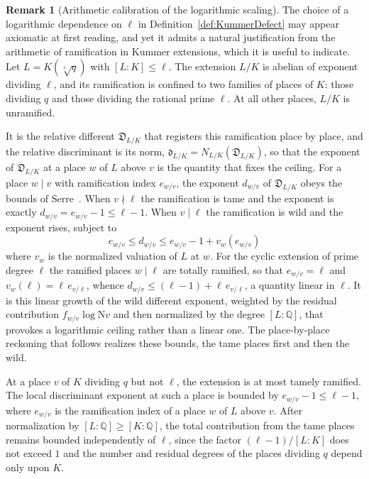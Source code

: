 \documentclass[10pt, reqno]{amsart}
\theoremstyle{plain}
\theoremstyle{definition}
\newtheorem{remark}[theorem]{Remark}
\theoremstyle{plain}
\newcommand{\Q}{\mathbb{Q}}
\begin{document}
\begin{remark}[Arithmetic calibration of the logarithmic scaling]\label{rem:KummerDefectArithmeticCalibration}
The choice of a logarithmic dependence on $\ell$ in Definition~\ref{def:KummerDefect} may appear axiomatic at first reading, and yet it admits a natural justification from the arithmetic of ramification in Kummer extensions, which it is useful to indicate. Let $L = K(\sqrt[\ell]{q})$ with $[L:K] \leq \ell$. The extension $L/K$ is abelian of exponent dividing $\ell$, and its ramification is confined to two families of places of $K$: those dividing $q$ and those dividing the rational prime $\ell$. At all other places, $L/K$ is unramified.

It is the relative different $\mathfrak{D}_{L/K}$ that registers this ramification place by place, and the relative discriminant is its norm, $\mathfrak{d}_{L/K}=N_{L/K}(\mathfrak{D}_{L/K})$, so that the exponent of $\mathfrak{D}_{L/K}$ at a place $w$ of $L$ above $v$ is the quantity that fixes the ceiling. For a place $w \mid v$ with ramification index $e_{w/v}$, the exponent $d_{w/v}$ of $\mathfrak{D}_{L/K}$ obeys the bounds of Serre~\cite{Serre1979}. When $v \nmid \ell$ the ramification is tame and the exponent is exactly $d_{w/v}=e_{w/v}-1\le \ell-1$. When $v \mid \ell$ the ramification is wild and the exponent rises, subject to
\[
  e_{w/v} \le d_{w/v} \le e_{w/v}-1+v_w(e_{w/v})
\]
where $v_w$ is the normalized valuation of $L$ at $w$. For the cyclic extension of prime degree $\ell$ the ramified places $w \mid \ell$ are totally ramified, so that $e_{w/v}=\ell$ and $v_w(\ell)=\ell\, e_{v/\ell}$, whence $d_{w/v}\le (\ell-1)+\ell\, e_{v/\ell}$, a quantity linear in $\ell$. It is this linear growth of the wild different exponent, weighted by the residual contribution $f_{w/v}\log\mathrm{N}v$ and then normalized by the degree $[L:\Q]$, that provokes a logarithmic ceiling rather than a linear one. The place-by-place reckoning that follows realizes these bounds, the tame places first and then the wild.

At a place $v$ of $K$ dividing $q$ but not $\ell$, the extension is at most tamely ramified. The local discriminant exponent at such a place is bounded by $e_{w/v} - 1 \leq \ell - 1$, where $e_{w/v}$ is the ramification index of a place $w$ of $L$ above $v$. After normalization by $[L:\Q] \geq [K:\Q]$, the total contribution from the tame places remains bounded independently of $\ell$, since the factor $(\ell - 1) / [L:K]$ does not exceed $1$ and the number and residual degrees of the places dividing $q$ depend only upon $K$.


\end{remark}
\end{document}
